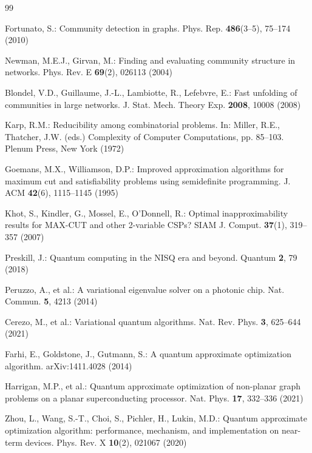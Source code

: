 \documentclass[pdflatex,sn-mathphys-num]{sn-jnl}
\theoremstyle{thmstyleone}
\theoremstyle{thmstyletwo}
\theoremstyle{thmstylethree}
\begin{document}
\begin{thebibliography}{99}
\footnotesize
\setlength{\itemsep}{0pt}
\setlength{\parskip}{2pt}

Fortunato, S.: Community detection in graphs. Phys. Rep. \textbf{486}(3--5), 75--174 (2010)

Newman, M.E.J., Girvan, M.: Finding and evaluating community structure in networks. Phys. Rev. E \textbf{69}(2), 026113 (2004)

Blondel, V.D., Guillaume, J.-L., Lambiotte, R., Lefebvre, E.: Fast unfolding of communities in large networks. J. Stat. Mech. Theory Exp. \textbf{2008}, 10008 (2008)

Karp, R.M.: Reducibility among combinatorial problems. In: Miller, R.E., Thatcher, J.W. (eds.) Complexity of Computer Computations, pp. 85--103. Plenum Press, New York (1972)

Goemans, M.X., Williamson, D.P.: Improved approximation algorithms for maximum cut and satisfiability problems using semidefinite programming. J. ACM \textbf{42}(6), 1115--1145 (1995)

Khot, S., Kindler, G., Mossel, E., O'Donnell, R.: Optimal inapproximability results for MAX-CUT and other 2-variable CSPs? SIAM J. Comput. \textbf{37}(1), 319--357 (2007)

Preskill, J.: Quantum computing in the NISQ era and beyond. Quantum \textbf{2}, 79 (2018)

Peruzzo, A., et al.: A variational eigenvalue solver on a photonic chip. Nat. Commun. \textbf{5}, 4213 (2014)

Cerezo, M., et al.: Variational quantum algorithms. Nat. Rev. Phys. \textbf{3}, 625--644 (2021)

Farhi, E., Goldstone, J., Gutmann, S.: A quantum approximate optimization algorithm. arXiv:1411.4028 (2014)

Harrigan, M.P., et al.: Quantum approximate optimization of non-planar graph problems on a planar superconducting processor. Nat. Phys. \textbf{17}, 332--336 (2021)

Zhou, L., Wang, S.-T., Choi, S., Pichler, H., Lukin, M.D.: Quantum approximate optimization algorithm: performance, mechanism, and implementation on near-term devices. Phys. Rev. X \textbf{10}(2), 021067 (2020)


\end{thebibliography}
\end{document}
